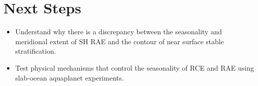 \documentclass[11pt]{article}
\begin{document}
\section{Next Steps}
\label{sec:org4fe6a89}
\begin{itemize}
\item Understand why there is a discrepancy between the seasonality and meridional extent of SH RAE and the contour of near surface stable stratification.
\item Test physical mechanisms that control the seasonality of RCE and RAE using slab-ocean aquaplanet experiments.
\end{itemize}



\end{document}
